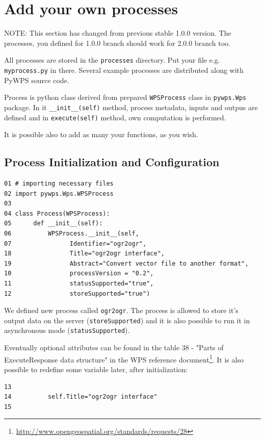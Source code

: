 \documentclass[a4paper,11pt]{article}
\newcommand{\note}[1]{\medskip{}\noindent{}NOTE: #1\medskip{}}
\begin{document}
\section{Add your own processes}
\note{This section has changed from previous stable 1.0.0 version. The
processes, you defined for 1.0.0 branch should work for 2.0.0 branch too.}
    
All processes are stored in the \texttt{processes} directory. Put your file
e.g. \texttt{myprocess.py} in there. Several example processes are
distributed along with PyWPS source code.
    
Process is python class derived from prepared \texttt{WPSProcess} class in
\texttt{pywps.Wps} package. In it \texttt{\_\_init\_\_(self)} method,
process metadata, inputs and outpus are defined and in
\texttt{execute(self)} method, own computation is performed.


It is possible also to add as many your functions, as you wish.
    
\subsection{Process Initialization and Configuration}

\begin{verbatim}
01 # importing necessary files
02 import pywps.Wps.WPSProcess
03 
04 class Process(WPSProcess):
05      def __init__(self):
06          WPSProcess.__init__(self,
07                Identifier="ogr2ogr",
18                Title="ogr2ogr interface",
19                Abstract="Convert vector file to another format",
10                processVersion = "0.2",
11                statusSupported="true",
12                storeSupported="true")
\end{verbatim}

We defined new process called \texttt{ogr2ogr}. The process is allowed to
store it's output data on the server (\texttt{storeSupported}) and it is also possible to run it in
asynchronous mode (\texttt{statusSupported}).
     
Eventually optional attributes can be found in the table 38 - "Parts of
ExecuteResponse data structure" in the WPS reference
document\footnote{\url{http://www.opengeospatial.org/standards/requests/28}}. It is also possible to redefine some
variable later, after initialization:

\begin{verbatim}
13
14          self.Title="ogr2ogr interface"
15
\end{verbatim}
\end{document}
